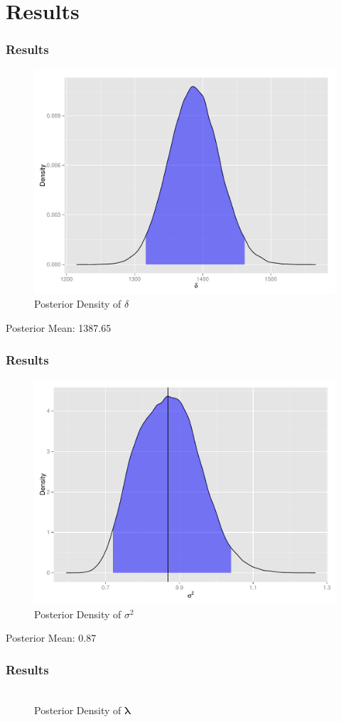 \documentclass[10pt, compress]{beamer}
\begin{document}
  \section{Results}
  \begin{frame}
    \frametitle{Results}
    \centering
    \begin{figure}
      \caption{Posterior Density of $\delta$}
      \includegraphics[height=0.725\textheight]{delta.pdf}
    \end{figure}
    Posterior Mean: 1387.65
  \end{frame}
  \begin{frame}
    \frametitle{Results}
    \centering
    \begin{figure}
      \caption{Posterior Density of $\sigma^2$}
      \includegraphics[height=0.725\textheight]{sigma2.pdf}
    \end{figure}
    Posterior Mean: 0.87
  \end{frame}
  \begin{frame}
    \frametitle{Results}
    \centering
    \begin{figure}
      \caption{Posterior Density of $\boldsymbol\lambda$}
      \includegraphics[height=0.9\textheight]{callLocationsPred.pdf}
    \end{figure}
  \end{frame}
\end{document}
